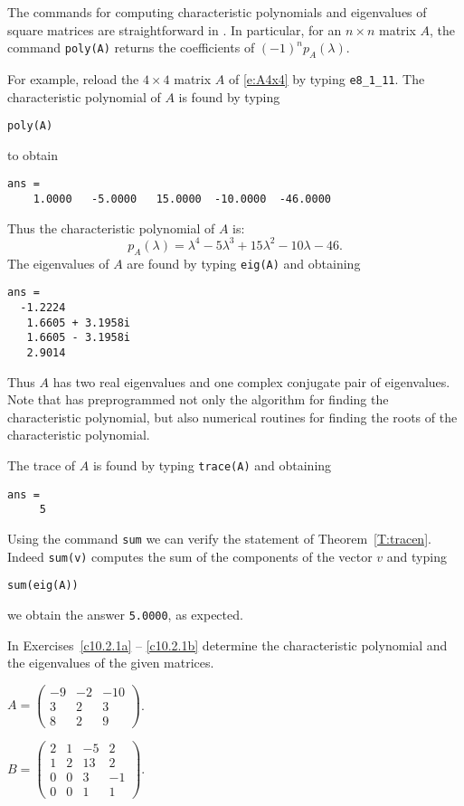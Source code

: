 \documentclass{ximera}
\begin{document}
The commands for computing characteristic polynomials and
eigenvalues of square matrices are straightforward in \Matlab.
In particular, for an $n\times n$ matrix $A$, the \Matlab command
 {\tt poly(A)} returns the coefficients of $(-1)^np_A(\lambda)$.

For example, reload the $4\times 4$ matrix $A$ of \eqref{e:A4x4}
by typing {\tt e8\_1\_11}.  The characteristic polynomial of $A$ is
found by typing
\begin{verbatim}
poly(A)
\end{verbatim} 
to obtain
\begin{verbatim}
ans =
    1.0000   -5.0000   15.0000  -10.0000  -46.0000
\end{verbatim} 
Thus the characteristic polynomial of $A$ is:
\[
p_A(\lambda) = \lambda^4 -5\lambda^3+15\lambda^2-10\lambda-46.
\]
The eigenvalues of $A$ are found by typing {\tt eig(A)} and
obtaining
\begin{verbatim}
ans =
  -1.2224          
   1.6605 + 3.1958i
   1.6605 - 3.1958i
   2.9014 
\end{verbatim}
Thus $A$ has two real eigenvalues and one complex conjugate pair
of eigenvalues.  Note that \Matlab has preprogrammed not only
the algorithm for finding the characteristic polynomial, but
also numerical routines for finding the roots of the
characteristic polynomial.

The trace of $A$ is found by typing {\tt trace(A)} and obtaining
\begin{verbatim} 
ans =
     5
\end{verbatim} 

Using the \Matlab command {\tt sum} we can verify the statement
of Theorem~\ref{T:tracen}.  Indeed {\tt sum(v)} computes the sum 
of the components of the vector $v$ and typing
\begin{verbatim}
sum(eig(A))
\end{verbatim}
we obtain the answer {\tt 5.0000}, as expected.

\EXER

\TEXER

\noindent In Exercises~\ref{c10.2.1a} -- \ref{c10.2.1b} determine the 
characteristic polynomial and the eigenvalues of the given matrices.
\begin{exercise} \label{c10.2.1a}
$A = \left(\begin{array}{rrr} -9 & -2 & -10 \\ 3 & 2 & 3 \\
8 & 2 & 9 \end{array}\right)$. 
\end{exercise}
\begin{exercise} \label{c10.2.1b}
$B = \left(\begin{array}{rrrr} 2 & 1 & -5 & 2 \\ 1 & 2 & 13 & 2 \\
0 & 0 & 3 & -1 \\ 0 & 0 & 1 & 1 \end{array}\right)$.
\end{exercise}
\end{document}
